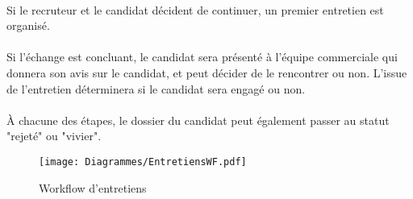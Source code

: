 \paragraph{} Si le recruteur et le candidat décident de continuer, un premier entretien est organisé. 
\paragraph{} Si l'échange est concluant, le candidat sera présenté à l'équipe commerciale qui donnera son avis sur le candidat, et peut décider de le rencontrer ou non. L'issue de l'entretien déterminera si le candidat sera engagé ou non. 
\paragraph{}À chacune des étapes, le dossier du candidat peut également passer au statut "rejeté" ou "vivier".


\begin{figure}
	\centering
	\begin{sideways}
	\texttt{[image: Diagrammes/EntretiensWF.pdf]}
	\end{sideways}
	\caption{Workflow d'entretiens}
	\label{entretiens}	
\end{figure}